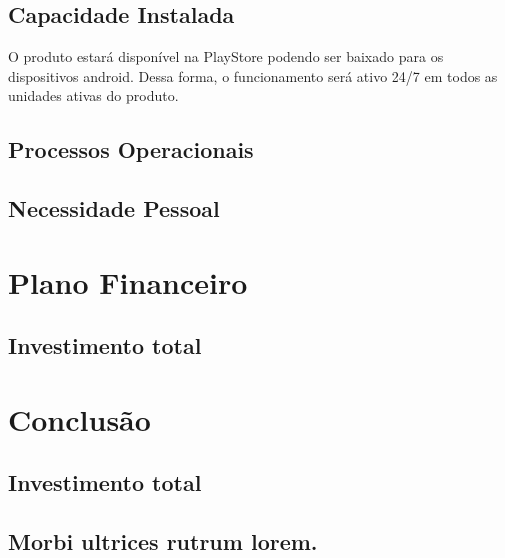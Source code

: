 \documentclass[
	12pt,				%
	openright,			%
	twoside,			%
	a4paper,			%
	english,			%
	french,				%
	spanish,			%
	brazil,				%
	]{abntex2}
\begin{document}
\section{Capacidade Instalada}

O produto estará disponível na PlayStore podendo ser baixado para os dispositivos android. Dessa forma, o funcionamento será ativo 24/7 em todos as unidades
ativas do produto.

\section{Processos Operacionais}

\section{Necessidade Pessoal}



\chapter{Plano Financeiro}

\section{Investimento total}



\chapter{Conclusão}

\section{Investimento total}

	



\begin{anexosenv}

\partanexos

\chapter{Morbi ultrices rutrum lorem.}
\lipsum[30]


\end{anexosenv}
\end{document}

